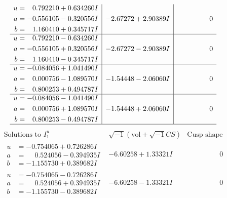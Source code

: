 \documentclass[1p]{elsarticle_modified}
\theoremstyle{definition}
\newcommand{\I}{\sqrt{-1}}
\begin{document}
$$\begin{array}{c|c|c}
\begin{aligned}
u &= \phantom{-}0.792210 + 0.634260 I \\
a &= -0.556105 - 0.320556 I \\
b &= \phantom{-}1.160410 + 0.345717 I\end{aligned}
 & -2.67272 + 2.90389 I & \phantom{-0.000000 } 0 \\ \hline\begin{aligned}
u &= \phantom{-}0.792210 - 0.634260 I \\
a &= -0.556105 + 0.320556 I \\
b &= \phantom{-}1.160410 - 0.345717 I\end{aligned}
 & -2.67272 - 2.90389 I & \phantom{-0.000000 } 0 \\ \hline\begin{aligned}
u &= -0.084056 + 1.041490 I \\
a &= \phantom{-}0.000756 - 1.089570 I \\
b &= \phantom{-}0.800253 + 0.494787 I\end{aligned}
 & -1.54448 - 2.06060 I & \phantom{-0.000000 } 0 \\ \hline\begin{aligned}
u &= -0.084056 - 1.041490 I \\
a &= \phantom{-}0.000756 + 1.089570 I \\
b &= \phantom{-}0.800253 - 0.494787 I\end{aligned}
 & -1.54448 + 2.06060 I & \phantom{-0.000000 } 0\\
 \hline 
 \end{array}$$\newpage$$\begin{array}{c|c|c}  
\text{Solutions to }I^u_{1}& \I (\text{vol} + \sqrt{-1}CS) & \text{Cusp shape}\\
 \hline 
\begin{aligned}
u &= -0.754065 + 0.726286 I \\
a &= \phantom{-}0.524056 - 0.394935 I \\
b &= -1.155730 + 0.389682 I\end{aligned}
 & -6.60258 + 1.33321 I & \phantom{-0.000000 } 0 \\ \hline\begin{aligned}
u &= -0.754065 - 0.726286 I \\
a &= \phantom{-}0.524056 + 0.394935 I \\
b &= -1.155730 - 0.389682 I\end{aligned}
 & -6.60258 - 1.33321 I & \phantom{-0.000000 } 0 \\ \hline\begin{aligned}

\end{aligned}
\end{array}$$
\end{document}
